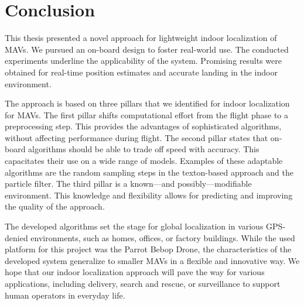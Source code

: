 \documentclass[11pt]{report}
\begin{document}


\chapter{Conclusion}
\label{chap:conclusion}

This thesis presented a novel approach for lightweight indoor
localization of MAVs. We pursued an on-board design to foster
real-world use. The conducted experiments underline the applicability
of the system. Promising results were obtained for real-time position
estimates and accurate landing in the indoor environment.

The approach is based on three pillars that we identified for indoor
localization for MAVs. The first pillar shifts computational effort
from the flight phase to a preprocessing step. This provides the
advantages of sophisticated algorithms, without affecting performance
during flight. The second pillar states that on-board algorithms
should be able to trade off speed with accuracy. This capacitates their use
on a wide range of models. Examples of these adaptable algorithms are
the random sampling steps in the texton-based approach and the
particle filter. The third pillar is a known---and
possibly---modifiable environment. This knowledge and flexibility
allows for predicting and improving the quality of the approach.

The developed algorithms set the stage for global localization in
various GPS-denied environments, such as homes, offices, or factory
buildings. While the used platform for this project was the Parrot
Bebop Drone, the characteristics of the developed system generalize to
smaller MAVs in a flexible and innovative way. We hope that our indoor
localization approach will pave the way for various applications,
including delivery, search and rescue, or surveillance to support
human operators in everyday life.

\printbibliography
\end{document}

